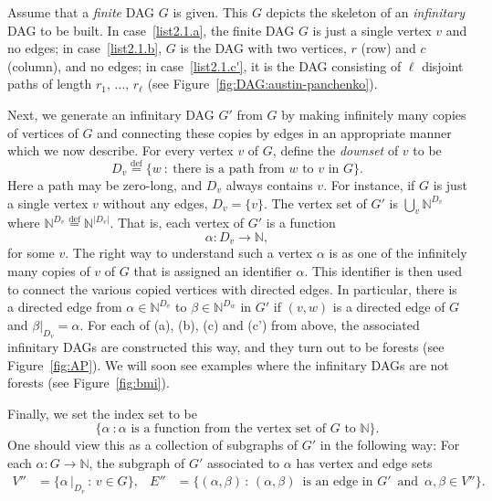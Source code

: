 \documentclass[10pt]{amsart}
\theoremstyle{definition}\newtheorem{defi}[theo]{Definition}\newtheorem{rema}[theo]{Remark}\newtheorem{exam}[theo]{Example}\newtheorem{exem}[theo]{Example}\newtheorem{nota}[theo]{Notation}
\newcommand{\alf}{\alpha}%
\newcommand*{\defeq}{\stackrel{\mathrm{def}}{=}}
\newcommand*\N{\mathbb{N}}
\begin{document}
Assume that a \emph{finite} DAG $G$ is given. This $G$ depicts the skeleton of an \emph{infinitary} DAG to be built. In case~\eqref{list2.1.a}, the finite DAG $G$ is just a single vertex $v$ and no edges; in case~\eqref{list2.1.b}, $G$ is the DAG with two vertices, $r$ (row) and $c$ (column), and no edges; in case~\eqref{list2.1.c'}, it is the DAG consisting of $\ell$ disjoint paths of length $r_1,\,\ldots,\,r_\ell$ (see Figure~\ref{fig:DAG:austin-panchenko}).

Next, we generate an infinitary DAG $G'$ from $G$ by making infinitely many copies of vertices of $G$ and connecting these copies by edges in an appropriate manner which we now describe. For every vertex $v$ of $G$, define the \emph{downset} of $v$ to be
\[
D_v
\defeq \{w~:~\text{there is a path from }w \text{ to }v \text{ in }G\}.
\]
Here a path may be zero-long, and $D_v$ always contains $v$. For instance, if $G$ is just a single vertex $v$ without any edges, $D_v = \{v\}$.
The vertex set of $G'$ is $\bigcup_v \N^{D_v}$ where $\N^{D_v}
\defeq\N^{|D_v|}$. That is, each vertex of $G'$ is a function
\[
\alf:D_v\to \N,
\]
for some $v$. The right way to understand such a vertex $\alf$ is as one of the infinitely many copies of $v$ of $G$ that is assigned an identifier $\alpha$. This identifier is then used to connect the various copied vertices with directed edges. In particular, there is a directed edge from $\alpha \in \N^{D_v}$ to $\beta \in \N^{D_w}$ in $G'$ if $(v,w)$ is a directed edge of $G$ and $\beta|_{D_v} = \alpha$. For each of (a), (b), (c) and (c') from above, the associated infinitary DAGs are constructed this way, and they turn out to be forests (see Figure~\ref{fig:AP}). We will soon see examples where the infinitary DAGs are not forests (see Figure~\ref{fig:bmi}).

Finally, we set the index set to be
\[
\{\alf~: \alf \text{ is a function from the vertex set of }G\text{ to }\N\}.
\]
One should view this as a collection of subgraphs of $G'$ in the following way: For each $\alpha : G \to \N$, the subgraph of $G'$ associated to $\alpha$ has vertex and edge sets
\begin{align*}
V'' & = \big\{\alpha\,\big|_{D_v}\,:\,v \in G\big\}, & E'' & = \big\{(\alpha,\beta)\,:\,(\alpha,\beta)\,\text{ is an edge in }G'\,
\text{ and }\,\alpha,\beta \in V'' \big\}.
\end{align*}

\end{document}

